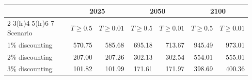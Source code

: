 \begin{tabular}{lrrrrrr}
\toprule
 & \multicolumn{2}{c}{2025} & \multicolumn{2}{c}{2050} & \multicolumn{2}{c}{2100} \\
\cmidrule(lr){2-3}\cmidrule(lr){4-5}\cmidrule(lr){6-7}
Scenario & $T\ge 0.5$ & $T\ge 0.01$ & $T\ge 0.5$ & $T\ge 0.01$ & $T\ge 0.5$ & $T\ge 0.01$ \\
\midrule
1\% discounting & 570.75 & 585.68 & 695.18 & 713.67 & 945.49 & 973.01 \\
2\% discounting & 207.00 & 207.26 & 302.13 & 302.54 & 554.01 & 555.01 \\
3\% discounting & 101.82 & 101.99 & 171.61 & 171.97 & 398.69 & 400.36 \\
\bottomrule
\end{tabular}
